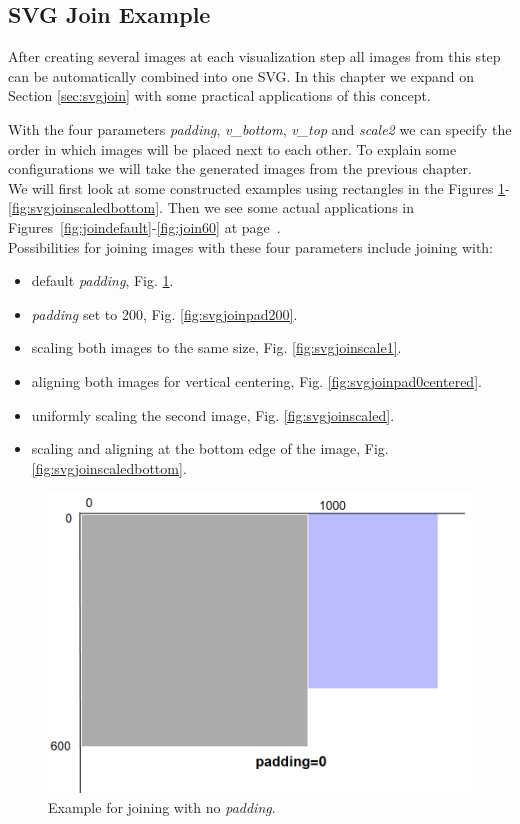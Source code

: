 \documentclass[a4paper, 12pt, bibliography=totoc]{scrartcl}
\begin{document}
\subsection{SVG Join Example}

After creating several images at each visualization step all images from this step can be automatically combined into one SVG. In this chapter we expand on Section \ref{sec:svgjoin} with some practical applications of this concept.

With the four parameters \textit{padding}, \textit{v\_bottom}, \textit{v\_top} and \textit{scale2} we can specify the order in which images will be placed next to each other. To explain some configurations we will take the generated images from the previous chapter.\\
\noindent
We will first look at some constructed examples using rectangles in the Figures \ref{fig:svgjoinpad0}-\ref{fig:svgjoinscaledbottom}. Then we see some actual applications in Figures~\ref{fig:joindefault}-\ref{fig:join60} at page~\pageref{fig:joindefault}.\noindent\\

\medskip\noindent
Possibilities for joining images with these four parameters include joining with:
\begin{itemize}[label=-, left=40pt]
	\item default \textit{padding}, Fig. \ref{fig:svgjoinpad0}.
	\item \textit{padding} set to 200, Fig. \ref{fig:svgjoinpad200}.
	\item scaling both images to the same size, Fig. \ref{fig:svgjoinscale1}.
	\item aligning both images for vertical centering, Fig. \ref{fig:svgjoinpad0centered}.
	\item uniformly scaling the second image, Fig. \ref{fig:svgjoinscaled}.
	\item scaling and aligning at the bottom edge of the image, Fig. \ref{fig:svgjoinscaledbottom}.
\end{itemize}

\begin{figure}[H]
	\centering
	\includegraphics[width=0.6\linewidth]{images/svgjoinpad0nn.png}
	\caption{Example for joining with no \textit{padding}.}
	\label{fig:svgjoinpad0}
\end{figure}
\end{document}
